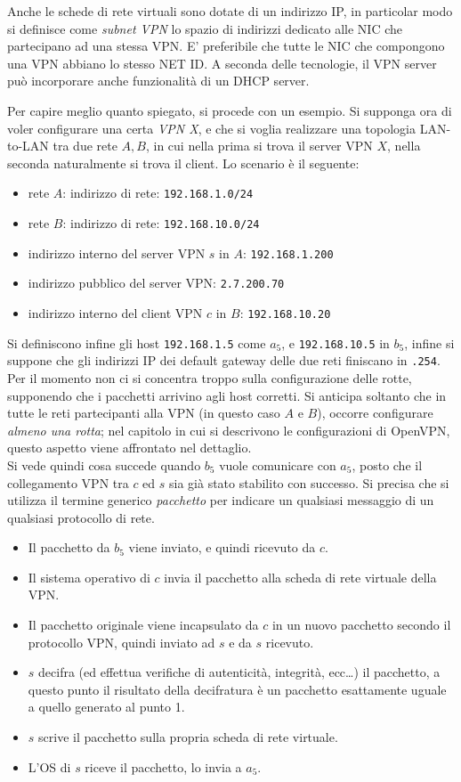 Anche le schede di rete virtuali sono dotate di un indirizzo IP, in particolar modo
si definisce come \textit{subnet VPN} lo spazio di indirizzi dedicato alle NIC
che partecipano ad una stessa VPN. E' preferibile che tutte le NIC che compongono
una VPN abbiano lo stesso NET ID. A seconda delle tecnologie, il VPN server
può incorporare anche funzionalità di un DHCP server.


Per capire meglio quanto spiegato, si procede con un esempio.
Si supponga ora di voler configurare una certa \textit{VPN X}, e che si voglia realizzare una
topologia LAN-to-LAN tra due rete $A, B$, in cui nella prima si trova il server VPN $X$,
nella seconda naturalmente si trova il client.  Lo scenario è il seguente:
\begin{itemize}
	\item rete $A$: indirizzo di rete: \texttt{192.168.1.0/24}
	\item rete $B$: indirizzo di rete: \texttt{192.168.10.0/24}
	\item indirizzo interno del server VPN $s$ in $A$: \texttt{192.168.1.200}
	\item indirizzo pubblico del server VPN: \texttt{2.7.200.70}
	\item indirizzo interno del client VPN $c$ in $B$: \texttt{192.168.10.20}
\end{itemize}
Si definiscono
infine gli host \texttt{192.168.1.5} come $a_5$, e \texttt{192.168.10.5} in $b_5$, infine
si suppone che gli indirizzi IP
dei default gateway delle due reti finiscano in \texttt{.254}.\\
Per il momento non ci si concentra troppo sulla configurazione delle rotte, supponendo che i
pacchetti arrivino
agli host corretti. Si anticipa soltanto che in tutte le reti partecipanti alla VPN
(in questo caso $A$ e $B$), occorre configurare \textit{almeno una rotta}; nel capitolo in cui si descrivono le configurazioni di OpenVPN,
questo aspetto viene affrontato nel dettaglio.\\
Si vede quindi cosa succede quando $b_5$ vuole comunicare con $a_5$, posto che il
collegamento VPN tra $c$ ed $s$ sia già stato stabilito con successo. Si precisa che
si utilizza il termine generico \textit{pacchetto} per indicare un qualsiasi messaggio
di un qualsiasi protocollo di rete.
\begin{itemize}
	\item Il pacchetto da $b_5$ viene inviato, e quindi ricevuto da $c$.
	\item Il sistema operativo di $c$ invia il pacchetto alla scheda di rete virtuale
	      della VPN.
	\item Il pacchetto originale viene incapsulato da $c$ in un nuovo pacchetto secondo
	      il protocollo VPN, quindi inviato ad $s$ e da $s$ ricevuto.
	\item $s$ decifra (ed effettua verifiche di autenticità, integrità, ecc\ldots) il
	      pacchetto, a questo punto il risultato della decifratura è un pacchetto esattamente
	      uguale a quello generato al punto 1.
	\item $s$ scrive il pacchetto sulla propria scheda di rete virtuale.
	\item L'OS di $s$ riceve il pacchetto, lo invia a $a_5$.
\end{itemize}


